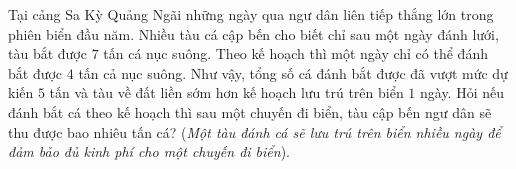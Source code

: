\begin{ex}%
Tại cảng Sa Kỳ Quảng Ngãi những ngày qua ngư dân liên tiếp thắng lớn trong phiên biển đầu năm. Nhiều tàu cá cập bến cho biết chỉ sau một ngày đánh lưới, tàu bắt được $7$ tấn cá nục suông. Theo kế hoạch thì một ngày chỉ có thể đánh bắt được $4$ tấn cả nục suông. Như vậy, tổng số cá đánh bắt được đã vượt mức dự kiến $5$ tấn và tàu về đất liền sớm hơn kế hoạch lưu trú trên biển $1$ ngày. Hỏi nếu đánh bắt cá theo kế hoạch thì sau một chuyến đi biển, tàu cập bến ngư dân sẽ thu được bao nhiêu tấn cá? (\textit{Một tàu đánh cá sẽ lưu trú trên biển nhiều ngày để đảm bảo đủ kinh phí cho một chuyến đi biển}).
\end{ex}

